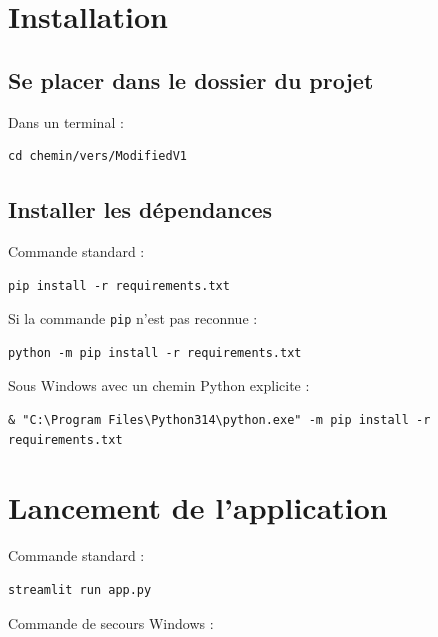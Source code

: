 \documentclass[11pt,a4paper]{article}
\begin{document}
\section{Installation}

\subsection{Se placer dans le dossier du projet}

Dans un terminal :

\begin{lstlisting}
cd chemin/vers/ModifiedV1
\end{lstlisting}

\subsection{Installer les dépendances}

Commande standard :

\begin{lstlisting}
pip install -r requirements.txt
\end{lstlisting}

Si la commande \texttt{pip} n'est pas reconnue :

\begin{lstlisting}
python -m pip install -r requirements.txt
\end{lstlisting}

Sous Windows avec un chemin Python explicite :

\begin{lstlisting}
& "C:\Program Files\Python314\python.exe" -m pip install -r requirements.txt
\end{lstlisting}

\section{Lancement de l'application}

Commande standard :

\begin{lstlisting}
streamlit run app.py
\end{lstlisting}

Commande de secours Windows :
\end{document}
